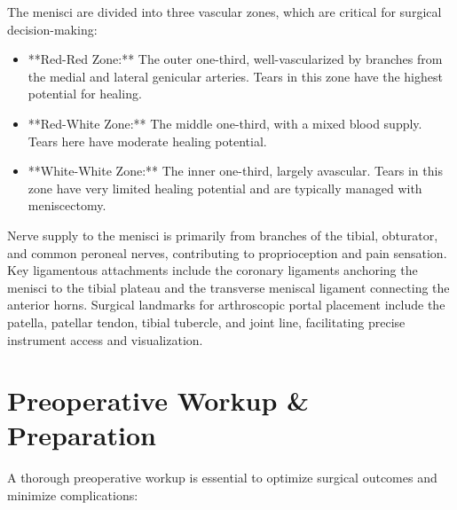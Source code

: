 The menisci are divided into three vascular zones, which are critical for surgical decision-making:

\begin{itemize}
  \item **Red-Red Zone:** The outer one-third, well-vascularized by branches from the medial and lateral genicular arteries. Tears in this zone have the highest potential for healing.
  \item **Red-White Zone:** The middle one-third, with a mixed blood supply. Tears here have moderate healing potential.
  \item **White-White Zone:** The inner one-third, largely avascular. Tears in this zone have very limited healing potential and are typically managed with meniscectomy.
\end{itemize}

Nerve supply to the menisci is primarily from branches of the tibial, obturator, and common peroneal nerves, contributing to proprioception and pain sensation. Key ligamentous attachments include the coronary ligaments anchoring the menisci to the tibial plateau and the transverse meniscal ligament connecting the anterior horns. Surgical landmarks for arthroscopic portal placement include the patella, patellar tendon, tibial tubercle, and joint line, facilitating precise instrument access and visualization.

\section*{Preoperative Workup \& Preparation}
A thorough preoperative workup is essential to optimize surgical outcomes and minimize complications:

